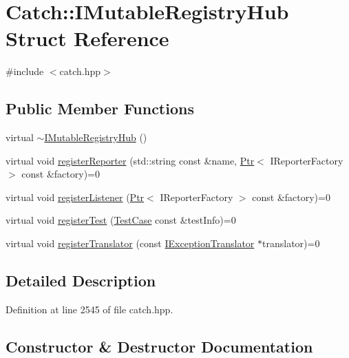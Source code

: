 \hypertarget{struct_catch_1_1_i_mutable_registry_hub}{}\section{Catch\+:\+:I\+Mutable\+Registry\+Hub Struct Reference}
\label{struct_catch_1_1_i_mutable_registry_hub}


{\ttfamily \#include $<$catch.\+hpp$>$}

\subsection*{Public Member Functions}
\begin{DoxyCompactItemize}
\item 
virtual \hyperlink{struct_catch_1_1_i_mutable_registry_hub_a759ca1e044e19f905fb4d306f1367193}{$\sim$\+I\+Mutable\+Registry\+Hub} ()
\item 
virtual void \hyperlink{struct_catch_1_1_i_mutable_registry_hub_aab72d0aa1fa14627f1a6a4c893ae0a12}{register\+Reporter} (std\+::string const \&name, \hyperlink{class_catch_1_1_ptr}{Ptr}$<$ I\+Reporter\+Factory $>$ const \&factory)=0
\item 
virtual void \hyperlink{struct_catch_1_1_i_mutable_registry_hub_ae06fcb90ba3f2b389d450cd81e229276}{register\+Listener} (\hyperlink{class_catch_1_1_ptr}{Ptr}$<$ I\+Reporter\+Factory $>$ const \&factory)=0
\item 
virtual void \hyperlink{struct_catch_1_1_i_mutable_registry_hub_a11b85c6744d88c9f83fe16ad4a8dd451}{register\+Test} (\hyperlink{class_catch_1_1_test_case}{Test\+Case} const \&test\+Info)=0
\item 
virtual void \hyperlink{struct_catch_1_1_i_mutable_registry_hub_ae6825365102693cf7707db022a2c2b49}{register\+Translator} (const \hyperlink{struct_catch_1_1_i_exception_translator}{I\+Exception\+Translator} $\ast$translator)=0
\end{DoxyCompactItemize}


\subsection{Detailed Description}


Definition at line 2545 of file catch.\+hpp.



\subsection{Constructor \& Destructor Documentation}
\hypertarget{struct_catch_1_1_i_mutable_registry_hub_a759ca1e044e19f905fb4d306f1367193}{}\label{struct_catch_1_1_i_mutable_registry_hub_a759ca1e044e19f905fb4d306f1367193} 
